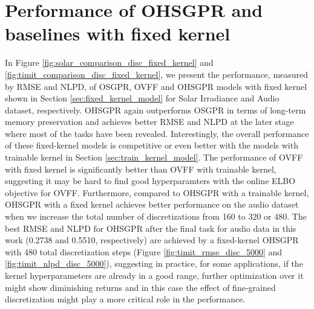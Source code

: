 \section{Performance of OHSGPR and baselines with fixed kernel}
\label{sec:additional_result}
In Figure \ref{fig:solar_comparison_disc_fixed_kernel} and \ref{fig:timit_comparison_disc_fixed_kernel}, we present the performance, measured by RMSE and NLPD, of OSGPR, OVFF and OHSGPR models with fixed kernel shown in Section \ref{sec:fixed_kernel_model} for Solar Irradiance and Audio dataset, respectively. OHSGPR again outperforms OSGPR in terms of long-term memory preservation and achieves better RMSE and NLPD at the later stage where most of the tasks have been revealed. Interestingly, the overall performance of these fixed-kernel models is competitive or even better with the models with trainable kernel in Section \ref{sec:train_kernel_model}. The performance of OVFF with fixed kernel is significantly better than OVFF with trainable kernel, suggesting it may be hard to find good hyperparamters with the online ELBO objective for OVFF. Furthermore, compared to OHSGPR with a trainable kernel, OHSGPR with a fixed kernel achieves better performance on the audio dataset when we increase the total number of discretizations from 160 to 320 or 480. The best RMSE and NLPD for OHSGPR after the final task for audio data in this work (0.2738 and 0.5510, respectively) are achieved by a fixed-kernel OHSGPR with 480 total discretization steps (Figure \ref{fig:timit_rmse_disc_5000} and \ref{fig:timit_nlpd_disc_5000}), suggesting in practice, for some applications, if the kernel hyperparameters are already in a good range, further optimization over it might show diminishing returns and in this case the effect of fine-grained discretization might play a more critical role in the performance. 


